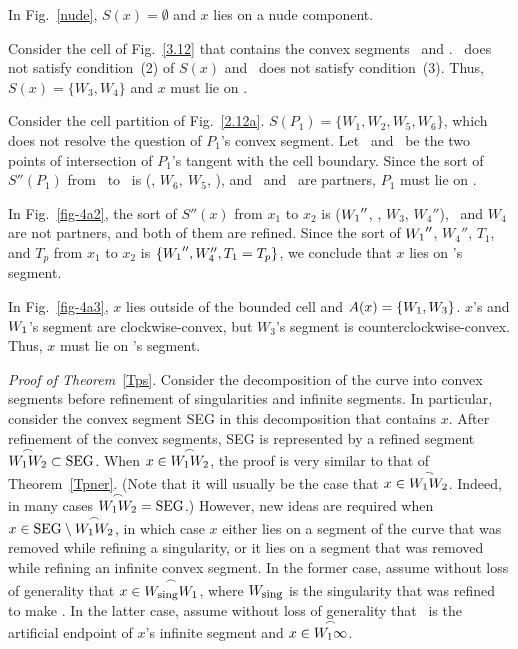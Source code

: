 \begin{example}
{\rm 
In Fig.~\ref{nude}, $S(x) = \emptyset$ and $x$ lies on a nude component.

Consider the cell of Fig.~\ref{3.12} that contains the convex segments 
\wwa\ and .
\wo\ does not satisfy condition~(2) of $S(x)$ and \wt\ does not 
satisfy condition~(3).
Thus, $S(x) = \{W_{3},W_{4}\}$ and $x$ must lie on .

Consider the cell partition of Fig.~\ref{2.12a}.
$S(P_{1}) = \{W_{1},W_{2},W_{5},W_{6}\}$, which does not resolve the 
question
of $P_{1}$'s convex segment.
Let \xo\ and \xt\ be the two points of intersection of $P_{1}$'s tangent
with the cell boundary.
Since the sort of $S''(P_{1})$ from \xo\ to \xt\ is 
(\wo, $W_{6},\ W_{5}$, \wt),
and \wo\ and \wt\ are partners, $P_{1}$ must lie on \wwa.

In Fig.~\ref{fig-4a2}, the sort of $S''(x)$ from $x_{1}$ to $x_{2}$ 
is ($\mbox{$W_{1}$}''$,
\wt, $W_{3}$, $W_{4}''$), \wo\ and $W_{4}$ are not partners,
and both of them are refined. 
Since the sort of $\mbox{$W_{1}$}''$, $W_{4}''$, $T_{1}$, and $T_{p}$ from $x_{1}$ to
$x_{2}$ is $\{\mbox{$W_{1}$}'',W_{4}'',T_{1} = T_{p}\}$, we conclude that $x$ lies 
on \wo's segment.

In Fig.~\ref{fig-4a3}, $x$ lies outside of the bounded cell and
$A(x) = \{\mbox{$W_{1}$},W_{3}\}$.
$x$'s and $\mbox{$W_{1}$}$'s segment are
clockwise-convex, but $W_{3}$'s segment is counterclockwise-convex.
Thus, $x$ must lie on \wo's segment.
}
\end{example}
%
\par{\it Proof of Theorem}~\ref{Tps}. \ignorespaces
Consider the decomposition of the curve into convex segments before 
refinement
of singularities and infinite segments.
In particular, consider the convex segment SEG in this decomposition 
that contains $x$.
After refinement of the convex segments, SEG is represented by a 
refined segment
$\mbox{$\stackrel{\frown}{\mbox{$W_{1}$}\mbox{$W_{2}$}}$} \subset \mbox{SEG}$.
When $x \in  \mbox{$\stackrel{\frown}{\mbox{$W_{1}$}\mbox{$W_{2}$}}$}$, the proof is very similar to that of 
Theorem~\ref{Tpner}.
(Note that it will usually be the case that $x \in  \mbox{$\stackrel{\frown}{\mbox{$W_{1}$}\mbox{$W_{2}$}}$}$.
Indeed, in many cases $\mbox{$\stackrel{\frown}{\mbox{$W_{1}$}\mbox{$W_{2}$}}$} = \mbox{SEG}$.)
However, new ideas are required when 
$x \in \mbox{SEG} \setminus \mbox{$\stackrel{\frown}{\mbox{$W_{1}$}\mbox{$W_{2}$}}$}$, 
in which case
$x$ either lies on a segment of the curve that was removed while 
refining a singularity,
or it lies on a segment that was removed while refining an infinite 
convex segment.
In the former case, 
assume without loss of generality that 
$x \in \mbox{$\stackrel{\frown}{W_{\mbox{\footnotesize{sing}}}\mbox{$W_{1}$}}$}$,
where $W_{\mbox{\footnotesize{sing}}}$ is the singularity that was 
refined to make \wo.
In the latter case, assume without loss of generality that \wo\ is the 
artificial endpoint
of $x$'s infinite segment and $x \in \mbox{$\stackrel{\frown}{\mbox{$W_{1}$}\infty}$}$.

